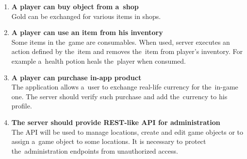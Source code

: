 \begin{enumerate}
			\item \textbf{A player can buy object from a~shop} \\
			Gold can be exchanged for various items in shops.
			
			\item \textbf{A player can use an item from his inventory} \\
			Some items in the~game are consumables. When used, server executes an action defined by the~item and removes the~item from player's inventory. For example a~health potion heals the~player when consumed.
			
			\item \textbf{A player can purchase in-app product} \\
			The application allows a~user to exchange real-life currency for the~in-game one. The server should verify such purchase and add the~currency to his profile.
			
			\item \textbf{The server should provide REST-like API for administration} \\	
			The API will be used to manage locations, create and edit game objects or to assign a~game object to some locations. It is necessary to protect the~administration endpoints from unauthorized access.
			
		\end{enumerate}
		
		
